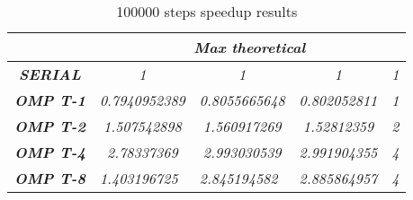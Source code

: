 \begin{table}
    \centering
    \begin{tabular}{|c|c|c|c|c|} 
    \hline
                                                    & \multicolumn{4}{c|}{\textbf{\textit{Max theoretical}}}                                                                                                               \\ 
    \hline
    \textbf{\textit{SERIAL}}                        & \textit{1}                                & \textit{1}                                & \textit{1}                                & \textit{1}                       \\ 
    \hline
    \textbf{\textit{OMP T-1}}                       & \textit{0.7940952389}                     & \textit{0.8055665648}                     & \textit{0.802052811}                      & \textit{1}                       \\ 
    \hline
    \textbf{\textit{OMP T-2}}                       & \textit{1.507542898}                      & \textit{1.560917269}                      & \textit{1.52812359}                       & \textit{2}                       \\ 
    \hline
    \textbf{\textit{OMP T-4}}                       & \textit{2.78337369}                       & \textit{2.993030539}                      & \textit{2.991904355}                      & \textit{4}                       \\ 
    \hline
    \multicolumn{1}{|l|}{\textbf{\textit{OMP T-8}}} & \multicolumn{1}{l|}{\textit{1.403196725}} & \multicolumn{1}{l|}{\textit{2.845194582}} & \multicolumn{1}{l|}{\textit{2.885864957}} & \multicolumn{1}{l|}{\textit{4}}  \\
    \hline
    \end{tabular}
    \caption{100000 steps speedup results}
\end{table}